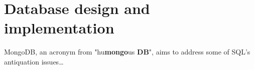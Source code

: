 \chapter{Database design and implementation}

MongoDB, an acronym from "hu\textbf{mongo}us \textbf{DB}", aims to address some of SQL's antiquation issues\dots